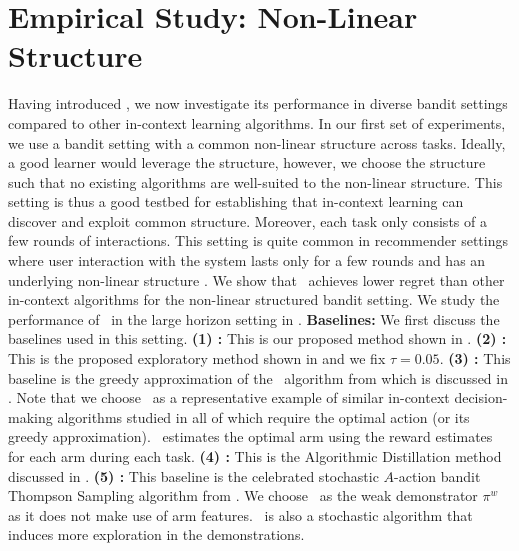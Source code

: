 \documentclass[10pt]{article}
\theoremstyle{plain}
\theoremstyle{definition}
\theoremstyle{remark}
\begin{document}
\section{Empirical Study: Non-Linear Structure}
\vspace*{-0.3em}
\label{sec:short-horizon}
Having introduced \pred, we now investigate its performance in diverse bandit settings compared to other in-context learning algorithms.
In our first set of experiments, we use a bandit setting with a common non-linear structure across tasks.
Ideally, a good learner would leverage the structure, however, we choose the structure such that no existing algorithms are well-suited to the non-linear structure.
This setting is thus a good testbed for establishing that in-context learning can discover and exploit common structure.
Moreover, each task only consists of a few rounds of interactions.
This setting is quite common in recommender settings where user interaction with the system lasts only for a few rounds and has an underlying non-linear structure \citep{kwon2022tractable, tomkins2020rapidly}.
We show that \pred\ achieves lower regret than other in-context algorithms for the non-linear structured bandit setting.
We study the performance of \pred\ in the large horizon setting in .
\textbf{Baselines:} We first discuss the baselines used in this setting.
\noindent
\textbf{(1) \pred:} This is our proposed method shown in .
\textbf{(2) \predt:} This is the proposed exploratory method shown in  and we fix $\tau=0.05$.
\textbf{(3) \dptg:} This baseline is the greedy approximation of the \dpt\ algorithm from \citet{lee2023supervised} which is discussed in .
Note that we choose \dptg\ as a representative example of similar in-context decision-making algorithms studied in \citet{lee2023supervised, sinii2023context, lin2023transformers, ma2023rethinking, liu2023reason, liu2023self} all of which require the optimal action (or its greedy approximation).
\dptg\ estimates the optimal arm using the reward estimates for each arm during each task.
\textbf{(4) \ad:} This is the Algorithmic Distillation method \citep{laskin2022context, lu2021low} discussed in .
\textbf{(5) \ts:} This baseline is the celebrated stochastic $A$-action bandit Thompson Sampling algorithm from \citet{thompson1933likelihood,agrawal2012analysis,russo2018tutorial,zhu2020thompson}.
We choose \ts\ as the weak demonstrator $\pi^w$ as it does not make use of arm features.
\ts\ is also a stochastic algorithm that induces more exploration in the demonstrations.
\end{document}
